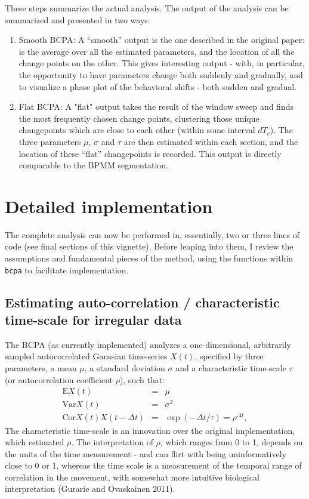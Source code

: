 \documentclass[10pt]{article}\usepackage[]{graphicx}\usepackage[]{color}
\newcommand{\ben}{\begin{enumerate}}
\newcommand{\een}{\end{enumerate}}
\newcommand{\I}{\item}
\begin{document}
These steps summarize the actual analysis.  The output of the analysis can be summarized and presented in two ways: 
 
\ben
\I Smooth BCPA: A ``smooth'' output is the one described in the original paper: is the average over all the estimated parameters, and the location of all the change points on the other.  This gives interesting output - with, in particular, the opportunity to have parameters change both suddenly and gradually, and to visualize a phase plot of the behavioral shifts - both sudden and gradual. 

\I Flat BCPA: A "flat" output takes the result of the window sweep and finds the most frequently chosen change points, clustering those unique changepoints which are close to each other (within some interval $dT_c$).  The three parameters $\mu$, $\sigma$ and $\tau$ are then estimated within each section, and the location of these ``flat'' changepoints is recorded.  This output is directly comparable to the BPMM segmentation. 
\een

\section{Detailed implementation}

The complete analysis can now be performed in, essentially, two or three lines of code (see final sections of this vignette).   Before leaping into them, I review the assumptions and fundamental pieces of the method, using the functions within \texttt{bcpa} to facilitate implementation.

\subsection{Estimating auto-correlation / characteristic time-scale for irregular data}

The BCPA (as currently implemented) analyzes a one-dimensional, arbitrarily sampled autocorrelated Gaussian time-series $X(t)$, specified by three parameters, a mean $\mu$, a standard deviation $\sigma$ and a characteristic time-scale $\tau$ (or autocorrelation coefficient $\rho$), such that:
\begin{eqnarray*}
  \text{E}{X(t)} &=& \mu	\nonumber\\
	\text{Var}{X(t)} &=& \sigma^2 \nonumber\\
	\text{Cor}{X(t)}{X(t-\Delta t)} &=& \exp(-\Delta t/\tau) = \rho^{\Delta t},
\end{eqnarray*}
\noindent 
The characteristic time-scale is an innovation over the original implementation, which estimated $\rho$.  The interpretation of  $\rho$, which ranges from 0 to 1, depends on the units of the time measurement - and can flirt with being uninformatively close to 0 or 1, whereas the time scale is a measurement of the temporal range of correlation in the movement, with somewhat more intuitive biological interpretation (Gurarie and Ovaskainen 2011).
\end{document}
